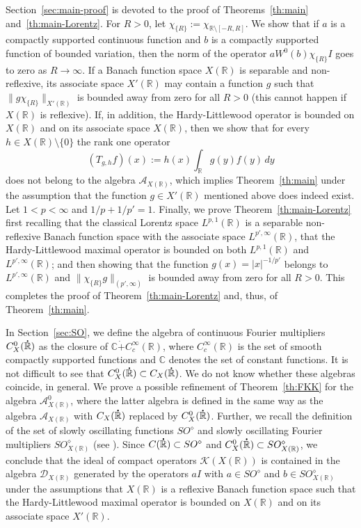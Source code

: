 \documentclass[reqno]{amsproc}
\newcommand{\cA}{\mathcal{A}}
\newcommand{\cK}{\mathcal{K}}
\newcommand{\dR}{{\bf\dot{\R}}}
\newcommand{\C}{\mathbb{C}}
\newcommand{\R}{\mathbb{R}}
\theoremstyle{definition}
\theoremstyle{remark}
\numberwithin{equation}{section}
\begin{document}
Section~\ref{sec:main-proof} is devoted to the proof of 
Theorems~\ref{th:main} and~\ref{th:main-Lorentz}. 
For $R>0$, let $\chi_{\{R\}}:=\chi_{\R\setminus[-R,R]}$.
We show that
if $a$ is a compactly supported continuous function and
$b$ is a compactly supported function of bounded variation,
then the norm of the operator $aW^0(b)\chi_{\{R\}}I$  goes to zero as 
$R\to\infty$. If a Banach function space $X(\R)$ is separable and 
non-reflexive, its associate space $X'(\R)$ may contain a function
$g$ such that $\|g\chi_{\{R\}}\|_{X'(\R)}$ is bounded away from
zero for all $R>0$ (this cannot happen if $X(\R)$ is reflexive).
If, in addition, the Hardy-Littlewood operator is bounded on $X(\R)$
and on its associate space $X(\R)$, then we show that 
for every $h\in X(\R)\setminus\{0\}$ the rank one operator
\[
(T_{g,h}f)(x) := h(x) \int_\R g(y) f(y)\, dy 
\]
does not belong to the algebra $\cA_{X(\R)}$, which implies
Theorem~\ref{th:main} under the assumption that the 
function $g\in X'(\R)$  mentioned  above does indeed exist. 
Let $1<p<\infty$ and $1/p+1/p'=1$.
Finally, we prove Theorem~\ref{th:main-Lorentz} first recalling that
the classical Lorentz space $L^{p,1}(\R)$ is a separable non-reflexive 
Banach function space with the associate space $L^{p',\infty}(\R)$, that 
the Hardy-Littlewood maximal operator is bounded on both $L^{p,1}(\R)$ 
and $L^{p',\infty}(\R)$; and then showing that the function 
$g(x)=|x|^{-1/p'}$ belongs to $L^{p',\infty}(\R)$ and 
$\|\chi_{\{R\}}g\|_{(p',\infty)}$ is bounded away from zero for all 
$R>0$. This completes the proof of Theorem~\ref{th:main-Lorentz} and,
thus, of Theorem~\ref{th:main}.

In Section~\ref{sec:SO}, we define the algebra of continuous
Fourier multipliers $C_{X}^0(\dR)$ as the closure of $\C\dot{+} C_c^\infty(\R)$,
where $C_c^\infty(\R)$ is the set of smooth compactly supported functions
and $\C$ denotes the set of constant functions. It is not difficult
to see that $C_X^0(\dR)\subset C_X(\dR)$. We do not know whether
these algebras coincide, in general. We prove a possible refinement of 
Theorem~\ref{th:FKK} for the algebra $\cA^0_{X(\R)}$, where the latter
algebra is defined in the same way as the algebra $\cA_{X(\R)}$
with $C_X(\dR)$ replaced by $C_X^0(\dR)$. Further, we recall
the definition of the set of slowly oscillating functions $SO^\diamond$
and slowly oscillating Fourier multipliers $SO_{X(\R)}^\diamond$
(see \cite{FKK20,K15c}). Since $C(\dR)\subset SO^\diamond$ and
$C_X^0(\dR)\subset SO_{X(\R)}^\diamond$, we conclude that
the ideal of compact operators $\cK(X(\R))$ is contained
in the algebra $\mathcal{D}_{X(\R)}$ generated by the operators $aI$
with $a\in SO^\diamond$ and $b\in SO_{X(\R)}^\diamond$ under the assumptions
that $X(\R)$ is a reflexive Banach function space such that the 
Hardy-Littlewood maximal operator is bounded on $X(\R)$ and on its associate
space $X'(\R)$.
\end{document}
